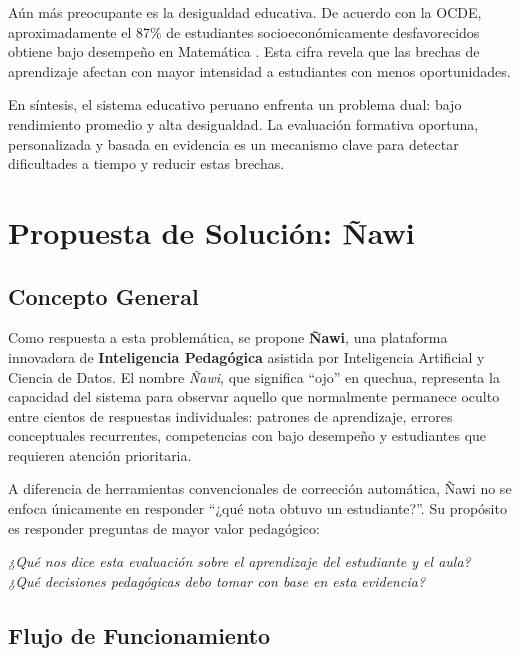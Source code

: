 \documentclass[12pt]{article}
\begin{document}
Aún más preocupante es la desigualdad educativa. De acuerdo con la OCDE, aproximadamente el 87\% de estudiantes socioeconómicamente desfavorecidos obtiene bajo desempeño en Matemática \cite{OECDSkillsPeru2026}. Esta cifra revela que las brechas de aprendizaje afectan con mayor intensidad a estudiantes con menos oportunidades.

En síntesis, el sistema educativo peruano enfrenta un problema dual: bajo rendimiento promedio y alta desigualdad. La evaluación formativa oportuna, personalizada y basada en evidencia es un mecanismo clave para detectar dificultades a tiempo y reducir estas brechas.

\section{Propuesta de Solución: Ñawi}

\subsection{Concepto General}

Como respuesta a esta problemática, se propone \textbf{Ñawi}, una plataforma innovadora de \textbf{Inteligencia Pedagógica} asistida por Inteligencia Artificial y Ciencia de Datos. El nombre \textit{Ñawi}, que significa ``ojo'' en quechua, representa la capacidad del sistema para observar aquello que normalmente permanece oculto entre cientos de respuestas individuales: patrones de aprendizaje, errores conceptuales recurrentes, competencias con bajo desempeño y estudiantes que requieren atención prioritaria.

A diferencia de herramientas convencionales de corrección automática, Ñawi no se enfoca únicamente en responder ``¿qué nota obtuvo un estudiante?''. Su propósito es responder preguntas de mayor valor pedagógico:

\begin{center}
\textit{¿Qué nos dice esta evaluación sobre el aprendizaje del estudiante y el aula?\\
¿Qué decisiones pedagógicas debo tomar con base en esta evidencia?}
\end{center}

\subsection{Flujo de Funcionamiento}
\end{document}

